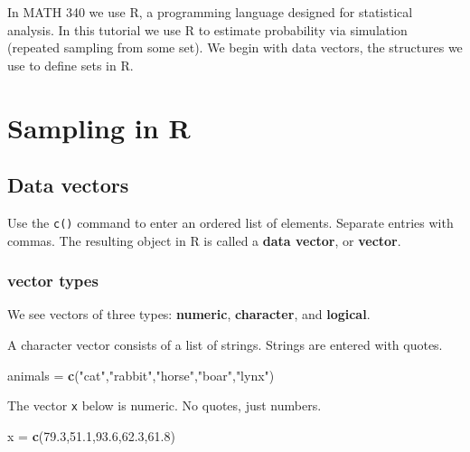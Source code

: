 \documentclass[
]{book}
\newenvironment{Shaded}{\begin{snugshade}}{\end{snugshade}}
\newcommand{\FloatTok}[1]{\textcolor[rgb]{0.00,0.00,0.81}{#1}}
\newcommand{\FunctionTok}[1]{\textcolor[rgb]{0.13,0.29,0.53}{\textbf{#1}}}
\newcommand{\NormalTok}[1]{#1}
\newcommand{\OtherTok}[1]{\textcolor[rgb]{0.56,0.35,0.01}{#1}}
\newcommand{\StringTok}[1]{\textcolor[rgb]{0.31,0.60,0.02}{#1}}
\theoremstyle{definition}
\theoremstyle{definition}
\theoremstyle{definition}
\theoremstyle{definition}
\theoremstyle{remark}
\begin{document}
In MATH 340 we use R, a programming language designed for statistical analysis. In this tutorial we use R to estimate probability via simulation (repeated sampling from some set). We begin with data vectors, the structures we use to define sets in R.

\chapter{Sampling in R}\label{sampling-in-R}

\section{Data vectors}\label{vectors-R}

Use the \texttt{c()} command to enter an ordered list of elements. Separate entries with commas. The resulting object in R is called a \textbf{data vector}, or \textbf{vector}.

\subsection*{vector types}\label{vector-types}

We see vectors of three types: \textbf{numeric}, \textbf{character}, and \textbf{logical}.

A character vector consists of a list of strings. Strings are entered with quotes.

\begin{Shaded}
\begin{Highlighting}[]
\NormalTok{animals }\OtherTok{=} \FunctionTok{c}\NormalTok{(}\StringTok{"cat"}\NormalTok{,}\StringTok{"rabbit"}\NormalTok{,}\StringTok{"horse"}\NormalTok{,}\StringTok{"boar"}\NormalTok{,}\StringTok{"lynx"}\NormalTok{)}
\end{Highlighting}
\end{Shaded}

The vector \texttt{x} below is numeric. No quotes, just numbers.

\begin{Shaded}
\begin{Highlighting}[]
\NormalTok{x }\OtherTok{=} \FunctionTok{c}\NormalTok{(}\FloatTok{79.3}\NormalTok{,}\FloatTok{51.1}\NormalTok{,}\FloatTok{93.6}\NormalTok{,}\FloatTok{62.3}\NormalTok{,}\FloatTok{61.8}\NormalTok{)}
\end{Highlighting}
\end{Shaded}
\end{document}
